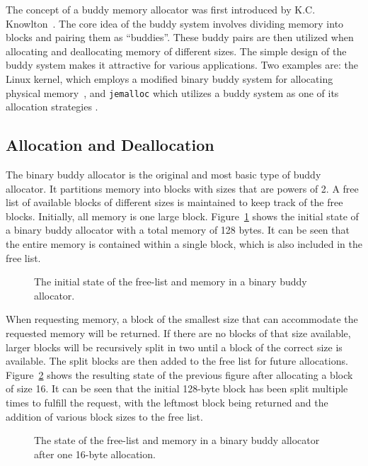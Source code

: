 The concept of a buddy memory allocator was first introduced by K.C. Knowlton~\cite{buddyog}. The core idea of the buddy system involves dividing memory into blocks and pairing them as ``buddies''. These buddy pairs are then utilized when allocating and deallocating memory of different sizes. The simple design of the buddy system makes it attractive for various applications. Two examples are: the Linux kernel, which employs a modified binary buddy system for allocating physical memory~\cite{linuxbuddy}, and \texttt{jemalloc} which utilizes a buddy system as one of its allocation strategies \cite{jemalloc}.

\subsection{Allocation and Deallocation}
The binary buddy allocator is the original and most basic type of buddy allocator. It partitions memory into blocks with sizes that are powers of 2. A free list of available blocks of different sizes is maintained to keep track of the free blocks. Initially, all memory is one large block. Figure~\ref{fig:buddystart} shows the initial state of a binary buddy allocator with a total memory of 128 bytes. It can be seen that the entire memory is contained within a single block, which is also included in the free list.

\begin{figure}[H]
    \centering
    
    \caption{The initial state of the free-list and memory in a binary buddy allocator.}
    \label{fig:buddystart}
\end{figure}

When requesting memory, a block of the smallest size that can accommodate the requested memory will be returned. If there are no blocks of that size available, larger blocks will be recursively split in two until a block of the correct size is available. The split blocks are then added to the free list for future allocations. Figure~\ref{fig:buddysplit} shows the resulting state of the previous figure after allocating a block of size 16. It can be seen that the initial 128-byte block has been split multiple times to fulfill the request, with the leftmost block being returned and the addition of various block sizes to the free list.

\begin{figure}[H]
    \centering
    
    \caption{The state of the free-list and memory in a binary buddy allocator after one 16-byte allocation.}
    \label{fig:buddysplit}
\end{figure}

